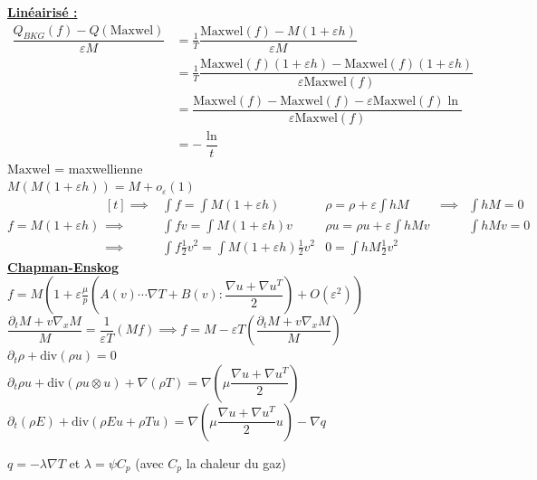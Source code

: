 \documentclass[12pt,a4paper]{article}
\begin{document}
\newpage

\textbf{\underline{Linéairisé :}}\\

\noindent$\begin{aligned}
	\dfrac{Q_{BKG}(f)- Q(\mathrm{Maxwel})}{\varepsilon M} & = \frac1T \dfrac{\mathrm{Maxwel}(f) - M(1+\varepsilon h)}{\varepsilon M} \\
	&= \frac1T \dfrac{\mathrm{Maxwel}(f)(1+\varepsilon h)- \mathrm{Maxwel}(f)(1+\varepsilon h)}{\varepsilon \mathrm{Maxwel}(f)} \\
	&= \dfrac{\mathrm{Maxwel}(f)-\mathrm{Maxwel}(f)-\varepsilon\mathrm{Maxwel}(f)\ln}{\varepsilon\mathrm{Maxwel}(f)} \\
	&=-\dfrac\ln t
\end{aligned}$ \hspace{2cm} $\mathrm{Maxwel}$ = maxwellienne\\

$M(M(1+\varepsilon h)) = M + o_\varepsilon(1)$\\

$f= M(1+\varepsilon h)  \begin{aligned}[t]
	\implies& \displaystyle\int f = \int M(1+\varepsilon h) & \rho = \rho + \varepsilon \int hM &\implies& \int hM = 0\\
	\implies& \int fv = \int M(1+\varepsilon h)v & \rho u = \rho u + \varepsilon \int hMv & & \int hMv = 0\\
	\implies& \int f\frac12 v^2= \int M(1+\varepsilon h)\frac12 v^2 & 0 = \int hM\frac12 v^2
\end{aligned}$\\

\textbf{\underline{Chapman-Enskog}}\\
$f=M\left(1+\varepsilon\frac\mu p \left(A(v)\cdots \nabla T + B(v) : \dfrac{\nabla u + \nabla u^T}2\right)+O(\varepsilon^2)\right)$\\

$\dfrac{\partial_t M + v\nabla_x M}M = \dfrac1{\varepsilon T}(Mf) \implies f = M - \varepsilon T\left(\dfrac{\partial_t M+v\nabla_x M}M\right)$\\

$\partial_t \rho + \mathrm{div}(\rho u) = 0$\\
$\partial_t \rho u + \mathrm{div}(\rho u\otimes u) + \nabla (\rho T) = \nabla\left(\mu \dfrac{\nabla u + \nabla u^T}2\right)$\\
$\partial_t (\rho E) + \mathrm{div}\left(\rho E u + \rho T u\right) = \nabla\left(\mu\dfrac{\nabla u + \nabla u ^T}2 u \right)-\nabla q$ \hspace{2cm} \begin{minipage}[t]{5cm}
	$q= -\lambda\nabla T$ et $\lambda = \psi C_p$ (avec $C_p$ la chaleur du gaz)
\end{minipage}
\end{document}
